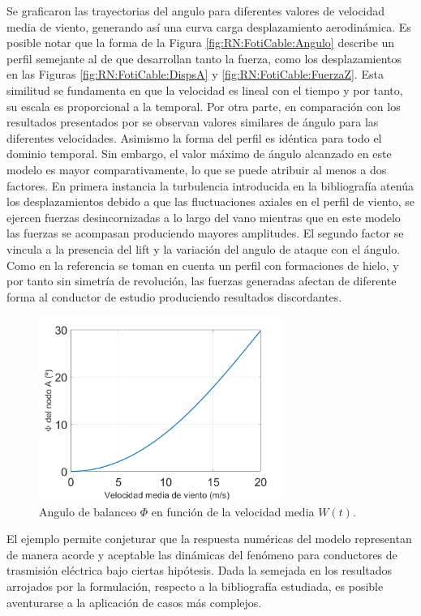 Se graficaron las trayectorias del angulo para diferentes valores de velocidad media de viento, generando así una curva carga desplazamiento aerodinámica. Es posible notar que la forma de la Figura \ref{fig:RN:FotiCable:Angulo} describe un perfil semejante al de que desarrollan tanto la fuerza, como los desplazamientos en las Figuras \ref{fig:RN:FotiCable:DispsA} y \ref{fig:RN:FotiCable:FuerzaZ}. Esta similitud se fundamenta en que la velocidad es lineal con el tiempo y por tanto, su escala es proporcional a la temporal.
Por otra parte, en comparación con los resultados presentados por \cite{foti2018finite} se observan valores similares de ángulo para las diferentes velocidades. Asimismo la forma del perfil es idéntica para todo el dominio temporal. Sin embargo, el valor máximo de ángulo alcanzado en este modelo es mayor comparativamente, lo que se puede atribuir al menos a dos factores. En primera instancia la turbulencia introducida en la bibliografía atenúa los desplazamientos debido a que las fluctuaciones axiales en el perfil de viento, se ejercen fuerzas desincornizadas a lo largo del vano mientras que en este modelo las fuerzas se acompasan produciendo mayores amplitudes. El segundo factor se vincula a la presencia del lift y la variación del angulo de ataque con el ángulo. Como en la referencia \cite{foti2018finite} se toman en cuenta un perfil con formaciones de hielo, y por tanto sin simetría de revolución, las fuerzas generadas afectan de diferente forma al conductor de estudio produciendo resultados discordantes. 


\begin{figure}[htbp]
\centering
\includegraphics[width=80mm]{./imagenes/ResultadosNumericos/SimpleCable/Angulo_Foti.png}
\caption{Angulo de balanceo $\Phi$ en función de la velocidad media $W(t)$.}
\label{fig:CableAngulo}
\end{figure}

El ejemplo permite conjeturar que la respuesta numéricas del modelo representan de manera acorde y aceptable las dinámicas del fenómeno para conductores de trasmisión eléctrica bajo ciertas hipótesis. Dada la semejada en los resultados arrojados por la formulación, respecto a la bibliografía estudiada, es posible aventurarse a la aplicación de casos más complejos. 



